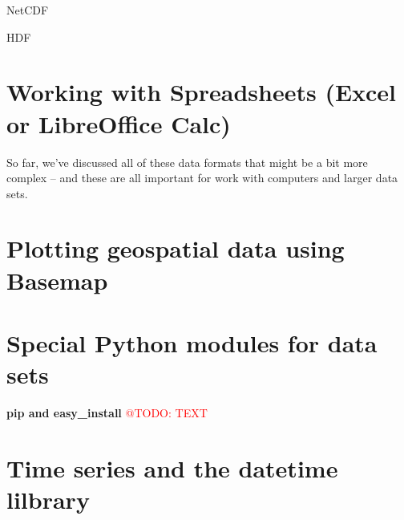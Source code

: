 \documentclass[a4paper,10pt]{scrartcl}
\makeatletter
\newcommand{\todo}[1]{\textcolor{red}{@TODO: #1}}
\makeatother
\begin{document}
NetCDF

HDF

\section{Working with Spreadsheets (Excel or LibreOffice Calc)}

So far, we've discussed all of these data formats that might be a bit more complex -- and these are all important for work with computers and larger data sets.


\section{Plotting geospatial data using Basemap}


\section{Special Python modules for data sets}

\begin{framed}
\textbf{pip and easy\_install}
\todo{TEXT}
\end{framed}



\section{Time series and the datetime lilbrary}
\end{document}
